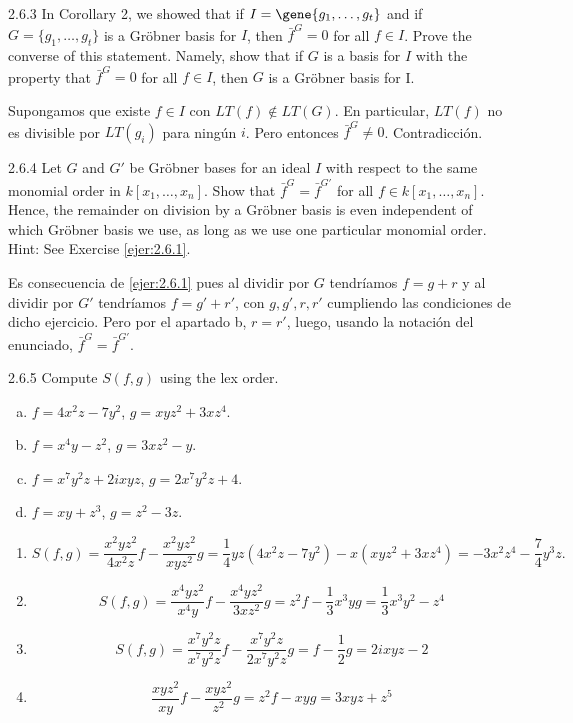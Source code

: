 \documentclass[twoside]{article}
\begin{document}
\begin{ejercicio}{2.6.3}
In Corollary 2, we showed that if $I =\gene{ 
g_1,\dots , g_t}$ and if $G = \{g_1,\dots , g_t\}$ is a Gröbner
basis for $I$, then $\bar{f}^G = 0$ for all $f ∈ I$. Prove the converse of this statement. Namely, show
that if $G$ is a basis for $I$ with the property that $\bar{f}^G = 0$ for all $f ∈ I$, then $G$ is a Gröbner
basis for I.

\end{ejercicio}
\begin{solucion}
Supongamos que existe $f\in I$ con $LT(f)\notin LT(G)$. En particular, $LT(f)$ no es divisible por $LT(g_i)$ para ningún $i$. Pero entonces $\bar{f}^G \neq 0$. Contradicción.
\end{solucion}

\newpage

\begin{ejercicio}{2.6.4}
Let $G$ and $G'$ be Gröbner bases for an ideal $I$ with respect to the same monomial order
in $k[x_1,\dots , x_n]$. Show that $\bar{f}^G = \bar{f}^{G'}$
for all $f ∈ k[x_1,\dots , x_n]$. Hence, the remainder on
division by a Gröbner basis is even independent of which Gröbner basis we use, as long
as we use one particular monomial order. Hint: See Exercise \ref{ejer:2.6.1}.
\end{ejercicio}
\begin{solucion}
Es consecuencia de \ref{ejer:2.6.1} pues al dividir por $G$ tendríamos $f=g+r$ y al dividir por $G'$ tendríamos $f=g'+r'$, con $g,g',r,r'$ cumpliendo las condiciones de dicho ejercicio. Pero por el apartado b, $r=r'$, luego, usando la notación del enunciado, $\bar{f}^G = \bar{f}^{G'}$.
\end{solucion}
\newpage

\begin{ejercicio}{2.6.5}
Compute $S( f , g)$ using the lex order.
\begin{enumerate}[a.]
\item $f = 4x^2z − 7y^2$, $g = xyz^2 + 3xz^4$.
\item $f = x^4y − z^2$, $g = 3xz^2 − y$.
\item $f = x^7y^2z + 2ixyz$, $g = 2x^7y^2z + 4$.
\item $f = xy + z^3$, $g = z^2 − 3z$.
\end{enumerate}
\end{ejercicio}
\begin{solucion}\mbox{}
\begin{enumerate}
\item \[ S(f,g) = \frac{x^2yz^2}{4x^2z}f - \frac{x^2yz^2}{xyz^2}g = \frac{1}{4}yz(4x^2z-7y^2)-x(xyz^2+3xz^4) =  -3x^2z^4 - \frac{7}{4}y^3z. \]
\item \[ S(f,g) = \frac{x^4yz^2}{x^4y}f - \frac{x^4yz^2}{3xz^2}g = z^2f-\frac{1}{3}x^3yg = \frac{1}{3}x^3y^2-z^4 \]
\item \[ S(f,g) = \frac{x^7y^2z}{x^7y^2z}f-\frac{x^7y^2z}{2x^7y^2z}g = f- \frac{1}{2}g = 2ixyz-2\]
\item \[ \frac{xyz^2}{xy}f-\frac{xyz^2}{z^2}g = z^2f-xyg = 3xyz+z^5 \]
\end{enumerate}
\end{solucion}
\end{document}
